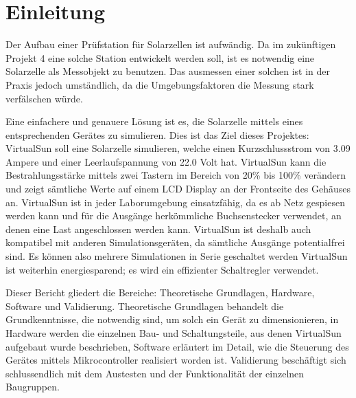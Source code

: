\documentclass[a4paper]{fhnwreport} %
\begin{document}
\section{Einleitung}

Der Aufbau einer Prüfstation für Solarzellen ist aufwändig. Da im zukünftigen Projekt 4 eine solche Station entwickelt werden soll, ist es notwendig eine Solarzelle als Messobjekt zu benutzen. Das ausmessen einer solchen ist in 
der Praxis jedoch umständlich, da die Umgebungsfaktoren die Messung stark verfälschen würde.


Eine einfachere und genauere Lösung ist es, die Solarzelle mittels eines entsprechenden Gerätes zu simulieren. Dies ist das Ziel dieses Projektes: VirtualSun soll eine Solarzelle simulieren, welche einen Kurzschlussstrom von 3.09 Ampere und einer Leerlaufspannung von 22.0 Volt hat. VirtualSun kann die Bestrahlungsstärke mittels zwei Tastern im Bereich von 20\% bis 100\% verändern und zeigt sämtliche Werte auf einem LCD Display an der Frontseite des Gehäuses an. VirtualSun ist in jeder Laborumgebung einsatzfähig, da es ab Netz gespiesen werden kann und für die Ausgänge herkömmliche Buchsenstecker verwendet, an denen eine Last angeschlossen werden kann. VirtualSun ist deshalb auch kompatibel mit anderen Simulationsgeräten, da sämtliche Ausgänge potentialfrei sind. Es können also mehrere Simulationen in Serie geschaltet werden  VirtualSun ist weiterhin energiesparend; es wird ein effizienter Schaltregler verwendet. 

Dieser Bericht gliedert
die Bereiche: Theoretische Grundlagen, Hardware, Software und Validierung. Theoretische Grundlagen behandelt die Grundkenntnisse, die notwendig sind, um solch ein Gerät zu dimensionieren, in Hardware werden die einzelnen Bau- und Schaltungsteile, aus denen VirtualSun aufgebaut wurde beschrieben, Software erläutert im Detail, wie die Steuerung des Gerätes mittels Mikrocontroller realisiert worden ist. Validierung beschäftigt sich schlussendlich mit dem Austesten und der Funktionalität der einzelnen Baugruppen.
\end{document}
